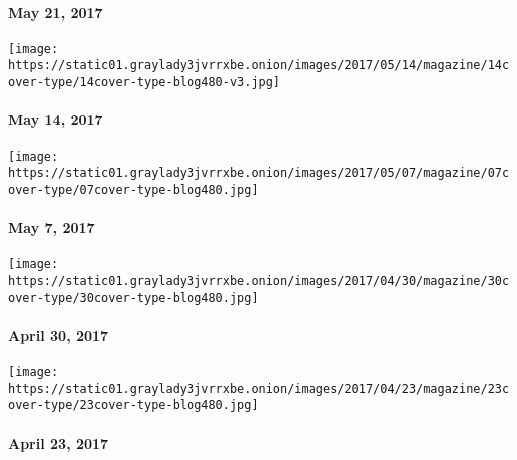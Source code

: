 \hypertarget{may-21-2017}{%
\paragraph{May 21, 2017}\label{may-21-2017}}

\href{https://www.nytimes3xbfgragh.onion/issue/magazine/2017/05/12/the-51417-issue-20170514}{}

\texttt{[image: https://static01.graylady3jvrrxbe.onion/images/2017/05/14/magazine/14cover-type/14cover-type-blog480-v3.jpg]}

\hypertarget{may-14-2017}{%
\paragraph{May 14, 2017}\label{may-14-2017}}

\href{https://www.nytimes3xbfgragh.onion/issue/magazine/2017/05/05/magazine-index-20170507}{}

\texttt{[image: https://static01.graylady3jvrrxbe.onion/images/2017/05/07/magazine/07cover-type/07cover-type-blog480.jpg]}

\hypertarget{may-7-2017}{%
\paragraph{May 7, 2017}\label{may-7-2017}}

\href{https://www.nytimes3xbfgragh.onion/issue/magazine/2017/04/28/magazine-index-20170430}{}

\texttt{[image: https://static01.graylady3jvrrxbe.onion/images/2017/04/30/magazine/30cover-type/30cover-type-blog480.jpg]}

\hypertarget{april-30-2017}{%
\paragraph{April 30, 2017}\label{april-30-2017}}

\href{https://www.nytimes3xbfgragh.onion/issue/magazine/2017/04/21/magazine-index-20170423}{}

\texttt{[image: https://static01.graylady3jvrrxbe.onion/images/2017/04/23/magazine/23cover-type/23cover-type-blog480.jpg]}

\hypertarget{april-23-2017}{%
\paragraph{April 23, 2017}\label{april-23-2017}}

\href{https://www.nytimes3xbfgragh.onion/issue/magazine/2017/04/14/magazine-index-20170416}{}

